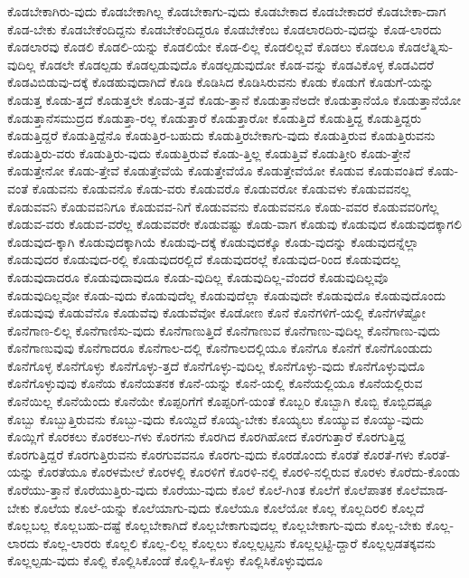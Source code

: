 {ಕೊಡಬೇಕಾಗಿರು-ವುದು
ಕೊಡಬೇಕಾಗಿಲ್ಲ
ಕೊಡಬೇಕಾಗು-ವುದು
ಕೊಡಬೇಕಾದ
ಕೊಡಬೇಕಾದರೆ
ಕೊಡಬೇಕಾ-ದಾಗ
ಕೊಡ-ಬೇಕು
ಕೊಡಬೇಕೆಂದಿದ್ದನು
ಕೊಡಬೇಕೆಂದಿದ್ದರೂ
ಕೊಡಬೇಕೆಂಬ
ಕೊಡಲಾರದಿರು-ವುದನ್ನು
ಕೊಡ-ಲಾರದು
ಕೊಡಲಾರವು
ಕೊಡಲಿ
ಕೊಡಲಿ-ಯನ್ನು
ಕೊಡಲಿಯೇ
ಕೊಡ-ಲಿಲ್ಲ
ಕೊಡಲಿಲ್ಲವೆ
ಕೊಡಲು
ಕೊಡಲೂ
ಕೊಡಲೆತ್ನಿಸು-ವುದಿಲ್ಲ
ಕೊಡಲೇ
ಕೊಡಲ್ಪಡು
ಕೊಡಲ್ಪಡುವುದೊ
ಕೊಡಲ್ಪಡುವುದೋ
ಕೊಡ-ವನ್ನು
ಕೊಡವಿಕೊಳ್ಳ
ಕೊಡವಿದರೆ
ಕೊಡವಿಬಿಡುವು-ದಕ್ಕೆ
ಕೊಡಹುವುದಾಗಿದೆ
ಕೊಡಿ
ಕೊಡಿಸಿದ
ಕೊಡಿಸಿರುವನು
ಕೊಡು
ಕೊಡುಗೆ
ಕೊಡುಗೆ-ಯನ್ನು
ಕೊಡುತ್ತ
ಕೊಡು-ತ್ತದೆ
ಕೊಡುತ್ತಲೇ
ಕೊಡು-ತ್ತವೆ
ಕೊಡು-ತ್ತಾನೆ
ಕೊಡುತ್ತಾನೆಅದೇ
ಕೊಡುತ್ತಾನೆಯೊ
ಕೊಡುತ್ತಾನೆಯೋ
ಕೊಡುತ್ತಾನೆಸಮುದ್ರದ
ಕೊಡುತ್ತಾ-ರಲ್ಲ
ಕೊಡುತ್ತಾರೆ
ಕೊಡುತ್ತಾರೋ
ಕೊಡುತ್ತಿದೆ
ಕೊಡುತ್ತಿದ್ದ
ಕೊಡುತ್ತಿದ್ದರು
ಕೊಡುತ್ತಿದ್ದರೆ
ಕೊಡುತ್ತಿದ್ದೆನೊ
ಕೊಡುತ್ತಿರ-ಬಹುದು
ಕೊಡುತ್ತಿರಬೇಕಾಗು-ವುದು
ಕೊಡುತ್ತಿರುವ
ಕೊಡುತ್ತಿರುವನು
ಕೊಡುತ್ತಿರು-ವರು
ಕೊಡುತ್ತಿರು-ವುದು
ಕೊಡುತ್ತಿರುವೆ
ಕೊಡು-ತ್ತಿಲ್ಲ
ಕೊಡುತ್ತಿವೆ
ಕೊಡುತ್ತೀರಿ
ಕೊಡು-ತ್ತೇನೆ
ಕೊಡುತ್ತೇನೋ
ಕೊಡು-ತ್ತೇವೆ
ಕೊಡುತ್ತೇವೆಯೆ
ಕೊಡುತ್ತೇವೆಯೊ
ಕೊಡುತ್ತೇವೆಯೋ
ಕೊಡುವ
ಕೊಡುವಂತಿದೆ
ಕೊಡು-ವಂತೆ
ಕೊಡುವನು
ಕೊಡುವನೊ
ಕೊಡು-ವರು
ಕೊಡುವರೊ
ಕೊಡುವರೋ
ಕೊಡುವಳು
ಕೊಡುವವನಲ್ಲ
ಕೊಡುವವನಿ
ಕೊಡುವವನಿಗೂ
ಕೊಡುವವ-ನಿಗೆ
ಕೊಡುವವನು
ಕೊಡುವವನೂ
ಕೊಡು-ವವರ
ಕೊಡುವವರಿಗೆಲ್ಲ
ಕೊಡುವ-ವರು
ಕೊಡುವ-ವರೆಲ್ಲ
ಕೊಡುವವರೇ
ಕೊಡುವಷ್ಟು
ಕೊಡು-ವಾಗ
ಕೊಡುವು
ಕೊಡುವುದ
ಕೊಡುವುದಕ್ಕಾಗಲಿ
ಕೊಡುವುದ-ಕ್ಕಾಗಿ
ಕೊಡುವುದಕ್ಕಾಗಿಯೆ
ಕೊಡುವು-ದಕ್ಕೆ
ಕೊಡುವುದಕ್ಕೊ
ಕೊಡು-ವುದನ್ನು
ಕೊಡುವುದನ್ನೆಲ್ಲಾ
ಕೊಡುವುದರ
ಕೊಡುವುದ-ರಲ್ಲಿ
ಕೊಡುವುದರಲ್ಲಿದೆ
ಕೊಡುವುದರಲ್ಲೆ
ಕೊಡುವುದ-ರಿಂದ
ಕೊಡುವುದಲ್ಲ
ಕೊಡುವುದಾದರೂ
ಕೊಡುವುದಾವುದೂ
ಕೊಡು-ವುದಿಲ್ಲ
ಕೊಡುವುದಿಲ್ಲ-ವೆಂದರೆ
ಕೊಡುವುದಿಲ್ಲವೊ
ಕೊಡುವುದಿಲ್ಲವೋ
ಕೊಡು-ವುದು
ಕೊಡುವುದೆಲ್ಲ
ಕೊಡುವುದೆಲ್ಲಾ
ಕೊಡುವುದೇ
ಕೊಡುವುದೊ
ಕೊಡುವುದೊಂದು
ಕೊಡುವುವು
ಕೊಡುವೆನೊ
ಕೊಡುವೆವು
ಕೊಡುವೆವೋ
ಕೊಡೋಣ
ಕೊನೆ
ಕೊನೆಗಳಿಗೆ-ಯಲ್ಲಿ
ಕೊನೆಗಳೆಷ್ಟೋ
ಕೊನೆಗಾಣ-ಲಿಲ್ಲ
ಕೊನೆಗಾಣಿಸು-ವುದು
ಕೊನೆಗಾಣುತ್ತಿದೆ
ಕೊನೆಗಾಣುವ
ಕೊನೆಗಾಣು-ವುದಿಲ್ಲ
ಕೊನೆಗಾಣು-ವುದು
ಕೊನೆಗಾಣುವುವು
ಕೊನೆಗಾದರೂ
ಕೊನೆಗಾಲ-ದಲ್ಲಿ
ಕೊನೆಗಾಲದಲ್ಲಿಯೂ
ಕೊನೆಗೂ
ಕೊನೆಗೆ
ಕೊನೆಗೊಂಡುದು
ಕೊನೆಗೊಳ್ಳ
ಕೊನೆಗೊಳ್ಳು
ಕೊನೆಗೊಳ್ಳು-ತ್ತದೆ
ಕೊನೆಗೊಳ್ಳು-ವುದಿಲ್ಲ
ಕೊನೆಗೊಳ್ಳು-ವುದು
ಕೊನೆಗೊಳ್ಳುವುದೊ
ಕೊನೆಗೊಳ್ಳುವುವು
ಕೊನೆಯ
ಕೊನೆಯತನಕ
ಕೊನೆ-ಯನ್ನು
ಕೊನೆ-ಯಲ್ಲಿ
ಕೊನೆಯಲ್ಲಿಯೂ
ಕೊನೆಯಲ್ಲಿರುವ
ಕೊನೆಯಿಲ್ಲ
ಕೊನೆಯೆಂದು
ಕೊನೆಯೇ
ಕೊಪ್ಪರಿಗೆಗೆ
ಕೊಪ್ಪರಿಗೆ-ಯಂತೆ
ಕೊಬ್ಬರಿ
ಕೊಬ್ಬಾಗಿ
ಕೊಬ್ಬಿ
ಕೊಬ್ಬಿದಷ್ಟೂ
ಕೊಬ್ಬು
ಕೊಬ್ಬುತ್ತಿರುವನು
ಕೊಬ್ಬು-ವುದು
ಕೊಯ್ದಿದೆ
ಕೊಯ್ಯ-ಬೇಕು
ಕೊಯ್ಯಲು
ಕೊಯ್ಯುವ
ಕೊಯ್ಯು-ವುದು
ಕೊಯ್ಲಿಗೆ
ಕೊರಕಲು
ಕೊರಕಲು-ಗಳು
ಕೊರಗನು
ಕೊರಗಿದ
ಕೊರಗಿಹೋದ
ಕೊರಗುತ್ತಾರೆ
ಕೊರಗುತ್ತಿದ್ದ
ಕೊರಗುತ್ತಿದ್ದರೆ
ಕೊರಗುತ್ತಿರುವನು
ಕೊರಗುವವನೂ
ಕೊರಗು-ವುದು
ಕೊರಡೊಂದು
ಕೊರತೆ
ಕೊರತೆ-ಗಳು
ಕೊರತೆ-ಯನ್ನು
ಕೊರತೆಯೂ
ಕೊರಳಮೇಲೆ
ಕೊರಳಲ್ಲಿ
ಕೊರಳಿಗೆ
ಕೊರಳಿ-ನಲ್ಲಿ
ಕೊರಳಿ-ನಲ್ಲಿರುವ
ಕೊರಳು
ಕೊರೆದು-ಕೊಂಡು
ಕೊರೆಯು-ತ್ತಾನೆ
ಕೊರೆಯುತ್ತಿರು-ವುದು
ಕೊರೆಯು-ವುದು
ಕೊಲೆ
ಕೊಲೆ-ಗಿಂತ
ಕೊಲೆಗೆ
ಕೊಲೆಪಾತಕ
ಕೊಲೆಮಾಡ-ಬೇಕು
ಕೊಲೆಯ
ಕೊಲೆ-ಯನ್ನು
ಕೊಲೆಯಾಗು-ವುದು
ಕೊಲೆಯೂ
ಕೊಲೆಯೋ
ಕೊಲ್ಲ
ಕೊಲ್ಲದಿರಲಿ
ಕೊಲ್ಲದೆ
ಕೊಲ್ಲಬಲ್ಲ
ಕೊಲ್ಲಬಹು-ದಷ್ಟೆ
ಕೊಲ್ಲಬೇಕಾಗಿದೆ
ಕೊಲ್ಲಬೇಕಾಗುವುದಲ್ಲ
ಕೊಲ್ಲಬೇಕಾಗು-ವುದು
ಕೊಲ್ಲ-ಬೇಕು
ಕೊಲ್ಲ-ಲಾರದು
ಕೊಲ್ಲ-ಲಾರರು
ಕೊಲ್ಲಲಿ
ಕೊಲ್ಲ-ಲಿಲ್ಲ
ಕೊಲ್ಲಲು
ಕೊಲ್ಲಲ್ಪಟ್ಟನು
ಕೊಲ್ಲಲ್ಪಟ್ಟಿ-ದ್ದಾರೆ
ಕೊಲ್ಲಲ್ಪಡತಕ್ಕವನು
ಕೊಲ್ಲಲ್ಪಡು-ವುದು
ಕೊಲ್ಲಿ
ಕೊಲ್ಲಿಸಿಕೊಂಡೆ
ಕೊಲ್ಲಿಸಿ-ಕೊಳ್ಳು
ಕೊಲ್ಲಿಸಿಕೊಳ್ಳುವುದೂ
}
